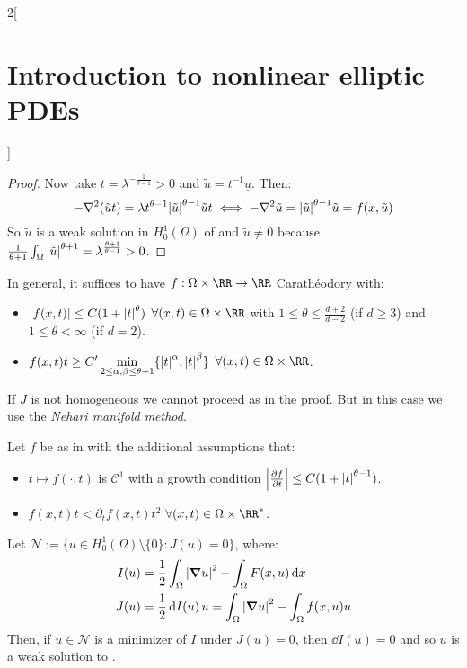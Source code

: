 \documentclass[../../../main_math.tex]{subfiles}
\begin{document}
\begin{multicols}{2}[\section{Introduction to nonlinear elliptic PDEs}]
\begin{proof}
    Now take $t=\lambda^{-\frac{1}{\theta-1}}>0$ and $\tilde{u}=t^{-1}\underline{u}$. Then:
    $$
      -\laplacian(\tilde{u}t)=\lambda t^{\theta-1}\abs{\tilde{u}}^{\theta-1}\tilde{u}t\iff -\laplacian \tilde{u}= \abs{\tilde{u}}^{\theta-1}\tilde{u}=f(x,\tilde{u})
    $$
    So $\tilde{u}$ is a weak solution in $H_0^1(\Omega)$ of  and $\tilde{u}\ne 0$ because $\frac{1}{\theta+1}\int_\Omega \abs{\tilde{u}}^{\theta+1}=\lambda^{\frac{\theta+1}{\theta-1}}>0$.
  \end{proof}
  \begin{remark}
    In general, it suffices to have $f:\Omega\times \RR\to\RR$ Carathéodory with:
    \begin{itemize}
      \item $\abs{f(x,t)}\leq C(1+\abs{t}^\theta)$ $\forall (x,t)\in \Omega\times \RR$ with $1\leq \theta\leq \frac{d+2}{d-2}$ (if $d\geq 3$) and $1\leq \theta<\infty$ (if $d=2$).
      \item $\displaystyle f(x,t)t\geq C'\min_{2\leq \alpha,\beta\leq \theta+1}\{\abs{t}^\alpha,\abs{t}^\beta\}$ $\forall (x,t)\in \Omega\times \RR$.
    \end{itemize}
  \end{remark}
  \begin{remark}
    If $J$ is not homogeneous we cannot proceed as in the proof. But in this case we use the \emph{Nehari manifold method}.
  \end{remark}
  \begin{proposition}
    Let $f$ be as in  with the additional assumptions that:
    \begin{itemize}
      \item $t\mapsto f(\cdot,t)$ is $\mathcal{C}^1$ with a growth condition $\abs{\pdv{f}{t}}\leq C(1+\abs{t}^{\theta-1})$.
      \item $f(x,t)t< \partial_tf(x,t)t^2$ $\forall (x,t)\in \Omega\times \RR^*$.
    \end{itemize}
    Let $\mathcal{N}:=\{u\in H_0^1(\Omega)\setminus\{0\}:J(u)=0\}$, where:
    \begin{align*}
      I(u) & =\frac{1}{2}\int_\Omega \abs{\grad u}^2-\int_\Omega F(x,u)\dd{x}           \\
      J(u) & =\frac{1}{2} \dd{I(u)}u = \int_\Omega \abs{\grad u}^2 -\int_\Omega f(x,u)u
    \end{align*}
    Then, if $\underline{u}\in\mathcal{N}$ is a minimizer of $I$ under $J(u)=0$, then $\dd{I(\underline{u})}=0$ and so $\underline{u}$ is a weak solution to .

\end{proposition}
\end{multicols}
\end{document}
